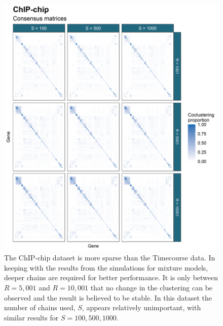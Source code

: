 \documentclass[]{article}
\begin{document}
\begin{figure}
	\centering
	\includegraphics[scale=0.8]{../Images/Yeast/ChIP-chipCMcomparison.png}
	\caption{The ChIP-chip dataset is more sparse than the Timecourse data. In keeping with the results from the simulations for mixture models, deeper chains are required for better performance. It is only between $R=5,001$ and $R=10,001$ that no change in the clustering can be observed and the result is believed to be stable. In this dataset the number of chains used, $S$, appears relatively unimportant, with similar results for $S=100, 500, 1000$.}
	\label{fig:chipchipCMs}
\end{figure}
\end{document}
